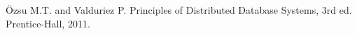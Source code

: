 \documentclass{beamer}
\begin{document}
\begin{frame}[allowframebreaks]
{\begin{thebibliography}{99}










 {\"O}zsu M.T. and Valduriez P. Principles of Distributed Database Systems, 3rd ed. Prentice-Hall, 2011.


\end{thebibliography}}
\end{frame}
\end{document}
